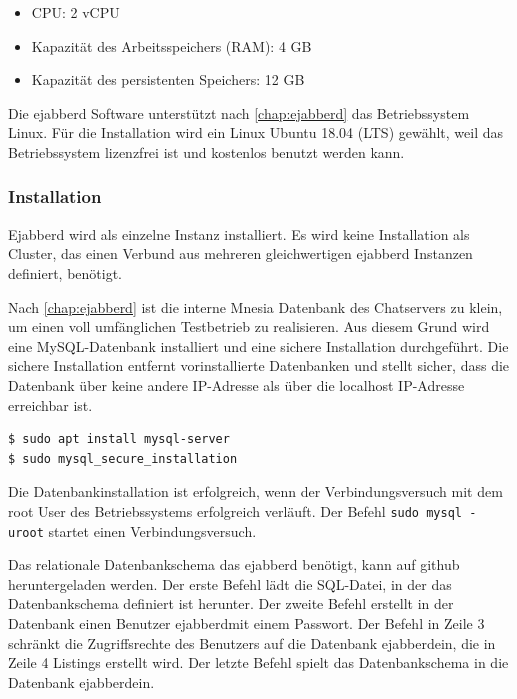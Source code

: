 \documentclass[a4paper,titlepage,halfparskip,12pt]{scrreprt}
\begin{document}
\begin{onehalfspacing}
\begin{itemize}
\item CPU: 2 vCPU
\item Kapazität des Arbeitsspeichers (RAM): 4 GB
\item Kapazität des persistenten Speichers: 12 GB
\end{itemize}

Die ejabberd Software unterstützt nach \autoref{chap:ejabberd} das Betriebssystem Linux. Für die Installation wird ein Linux Ubuntu 18.04 (LTS) gewählt, weil das Betriebssystem lizenzfrei ist und kostenlos benutzt werden kann.

\subsubsection*{Installation}

Ejabberd wird als einzelne Instanz installiert. Es wird keine Installation als Cluster, das einen Verbund aus mehreren gleichwertigen ejabberd Instanzen definiert, benötigt.

Nach \autoref{chap:ejabberd} ist die interne Mnesia Datenbank des Chatservers zu klein, um einen voll umfänglichen Testbetrieb zu realisieren. Aus diesem Grund wird eine MySQL-Datenbank installiert und eine sichere Installation durchgeführt. Die sichere Installation entfernt vorinstallierte Datenbanken und stellt sicher, dass die Datenbank über keine andere IP-Adresse als über die localhost IP-Adresse erreichbar ist.

\bigskip

\begin{lstlisting}[language=bash, caption={Installation der Mysql-Datenbank}]
$ sudo apt install mysql-server
$ sudo mysql_secure_installation
\end{lstlisting}

Die Datenbankinstallation ist erfolgreich, wenn der Verbindungsversuch mit dem root User des Betriebssystems erfolgreich verläuft. Der Befehl \texttt{sudo mysql -uroot} startet einen Verbindungsversuch.

Das relationale Datenbankschema das ejabberd benötigt, kann auf github heruntergeladen werden. Der erste Befehl lädt die SQL-Datei, in der das Datenbankschema definiert ist herunter. Der zweite Befehl erstellt in der Datenbank einen Benutzer \glqq ejabberd\grqq mit einem Passwort. Der Befehl in Zeile 3 schränkt die Zugriffsrechte des Benutzers auf die Datenbank \glqq ejabberd\grqq ein, die in Zeile 4 Listings erstellt wird. Der letzte Befehl spielt das Datenbankschema in die Datenbank \glqq ejabberd\grqq ein.


\end{onehalfspacing}
\end{document}
